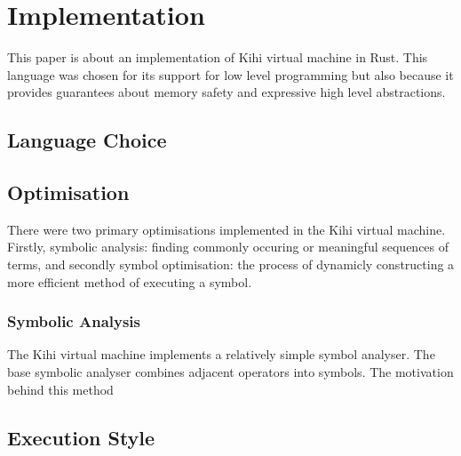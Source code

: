 \chapter{Implementation} \label{C:implementation} 

This paper is about an implementation of Kihi virtual machine
in Rust. This language was chosen for its support for low
level programming but also because it provides guarantees about
memory safety and expressive high level abstractions.

\section{Language Choice}

\section{Optimisation}
There were two primary optimisations implemented in the Kihi virtual
machine. Firstly, symbolic analysis: finding commonly occuring or
meaningful sequences of terms, and secondly symbol optimisation: the
process of dynamicly constructing a more efficient method of executing
a symbol. 

\subsection{Symbolic Analysis}
The Kihi virtual machine implements a relatively simple symbol analyser.
The base symbolic analyser combines adjacent operators into symbols. The
motivation behind this method

\section{Execution Style}

